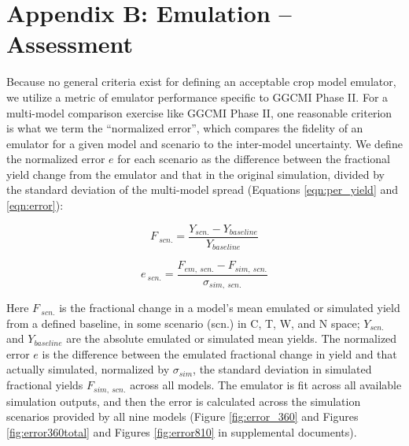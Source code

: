 \documentclass[preprint, 5p, times, twocolumn]{elsarticle}
\begin{document}
\begin{figure}[!p]
   \label{fig:error}
\end{figure}

\section{Appendix B: Emulation -- Assessment}
\label{A:2}
Because no general criteria exist for defining an acceptable crop model emulator, we utilize a metric of emulator performance specific to GGCMI Phase II. For a multi-model comparison exercise like GGCMI Phase II, one reasonable criterion is what we term the ``normalized error'', which compares the fidelity of an emulator for a given model and scenario to the inter-model uncertainty. We define the normalized error $e$ for each scenario as the difference between the fractional yield change from the emulator and that in the original simulation, divided by the standard deviation of the multi-model spread (Equations \ref{eqn:per_yield} and  \ref{eqn:error}):

\begin{equation}
    \label{eqn:per_yield}
    F_{\: scn.}=\frac{Y_{scn.}-Y_{baseline}}{Y_{baseline}}
\end{equation}

\begin{equation}
    \label{eqn:error}
    e_{\: scn.} =\frac{F_{em, \: scn.}-F_{sim, \: scn.}}{\sigma_{sim, \: scn.}}
\end{equation}

Here $F_{\: scn.}$ is the fractional change in a model's mean emulated or simulated yield from a defined baseline, in some scenario (scn.) in C, T, W, and N space; $Y_{scn.}$ and $Y_{baseline}$ are the absolute emulated or simulated mean yields. The normalized error $e$ is the difference between the emulated fractional change in yield and that actually simulated, normalized by $\sigma_{sim}$, the standard deviation in simulated fractional yields $F_{sim,\: scn.}$ across all models. The emulator is fit across all available simulation outputs, and then the error is calculated across the simulation scenarios provided by all nine models (Figure \ref{fig:error_360} and Figures \ref{fig:error360total} and Figures \ref{fig:error810} in supplemental documents). 
\end{document}
